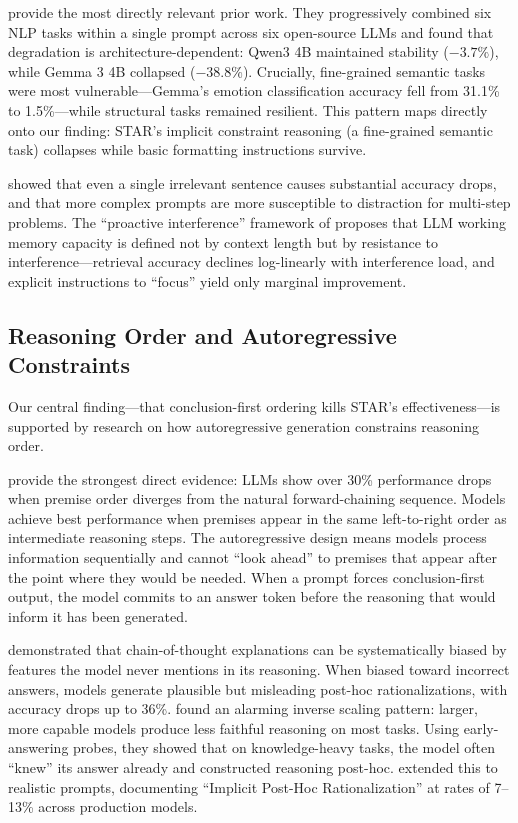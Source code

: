\documentclass[11pt]{article}
\begin{document}
\citet{dimaio2025} provide the most directly relevant prior work. They progressively combined six NLP tasks within a single prompt across six open-source LLMs and found that degradation is architecture-dependent: Qwen3 4B maintained stability ($-3.7\%$), while Gemma 3 4B collapsed ($-38.8\%$). Crucially, fine-grained semantic tasks were most vulnerable---Gemma's emotion classification accuracy fell from 31.1\% to 1.5\%---while structural tasks remained resilient. This pattern maps directly onto our finding: STAR's implicit constraint reasoning (a fine-grained semantic task) collapses while basic formatting instructions survive.

\citet{shi2023} showed that even a single irrelevant sentence causes substantial accuracy drops, and that more complex prompts are more susceptible to distraction for multi-step problems. The ``proactive interference'' framework of \citet{wang2025} proposes that LLM working memory capacity is defined not by context length but by resistance to interference---retrieval accuracy declines log-linearly with interference load, and explicit instructions to ``focus'' yield only marginal improvement.

\subsection{Reasoning Order and Autoregressive Constraints}

Our central finding---that conclusion-first ordering kills STAR's effectiveness---is supported by research on how autoregressive generation constrains reasoning order.

\citet{chen2024} provide the strongest direct evidence: LLMs show over 30\% performance drops when premise order diverges from the natural forward-chaining sequence. Models achieve best performance when premises appear in the same left-to-right order as intermediate reasoning steps. The autoregressive design means models process information sequentially and cannot ``look ahead'' to premises that appear after the point where they would be needed. When a prompt forces conclusion-first output, the model commits to an answer token before the reasoning that would inform it has been generated.

\citet{turpin2023} demonstrated that chain-of-thought explanations can be systematically biased by features the model never mentions in its reasoning. When biased toward incorrect answers, models generate plausible but misleading post-hoc rationalizations, with accuracy drops up to 36\%. \citet{lanham2023} found an alarming inverse scaling pattern: larger, more capable models produce less faithful reasoning on most tasks. Using early-answering probes, they showed that on knowledge-heavy tasks, the model often ``knew'' its answer already and constructed reasoning post-hoc. \citet{arcuschin2025} extended this to realistic prompts, documenting ``Implicit Post-Hoc Rationalization'' at rates of 7--13\% across production models.
\end{document}
